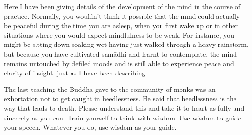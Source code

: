 Here I have been giving details of the development of the mind in the course of practice. Normally, you wouldn't think it possible that the mind could actually be peaceful during the time you are asleep, when you first wake up or in other situations where you would expect mindfulness to be weak. For instance, you might be sitting down soaking wet having just walked through a heavy rainstorm, but because you have cultivated sam\=adhi and learnt to contemplate, the mind remains untouched by defiled moods and is still able to experience peace and clarity of insight, just as I have been describing.

The last teaching the Buddha gave to the community of monks was an exhortation not to get caught in heedlessness. He said that heedlessness is the way that leads to death. Please understand this and take it to heart as fully and sincerely as you can. Train yourself to think with wisdom. Use wisdom to guide your speech. Whatever you do, use wisdom as your guide.
